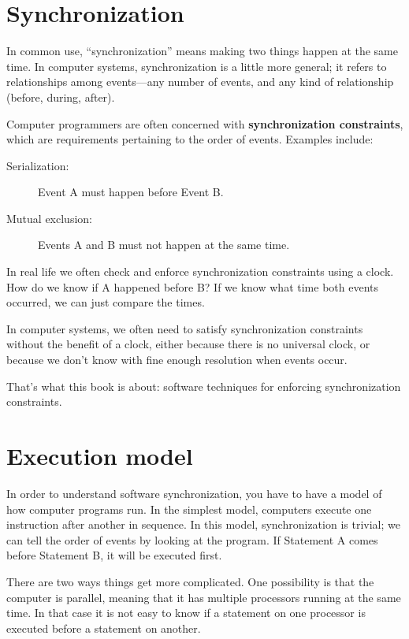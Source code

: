 \documentclass{book}
\begin{document}
\section{Synchronization}
\label{synch}

In common use, ``synchronization'' means making two things happen
at the same time.  In computer systems, synchronization is a little
more general; it refers to relationships among events---any number
of events, and any kind of relationship (before, during, after).

Computer programmers are often concerned with {\bf synchronization
constraints}, which are requirements pertaining to the order of
events.  Examples include:

\begin{description}

\item[Serialization:] Event A must happen before Event B.

\item[Mutual exclusion:] Events A and B must not happen at the same time.

\end{description}

In real life we often check and enforce synchronization constraints 
using a clock.  How do we know if A happened before B?  If we
know what time both events occurred, we can just compare the times.

In computer systems, we often need to satisfy synchronization
constraints without the benefit of a clock, either because there
is no universal clock, or because we don't know with fine enough
resolution when events occur.

That's what this book is about: software techniques for enforcing
synchronization constraints.


\section {Execution model}

In order to understand software synchronization, you have to
have a model of how computer programs run.  In the simplest
model, computers execute one instruction after another in
sequence.  In this model, synchronization is trivial; we can
tell the order of events by looking at the program.  If Statement
A comes before Statement B, it will be executed first.

There are two ways things get more complicated.  One possibility
is that the computer is parallel, meaning that it has multiple
processors running at the same time.  In that case it is not easy
to know if a statement on one processor is executed before a
statement on another.
\end{document}
